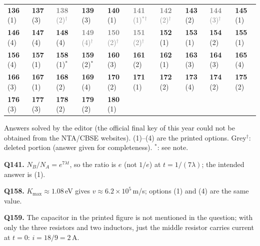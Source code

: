 {\small\setlength{\tabcolsep}{1pt}\renewcommand{\arraystretch}{1.5}
\begin{tabularx}{\linewidth}{@{}*{10}{>{\centering\arraybackslash}X}@{}}\toprule
\textbf{136}\,(1) & \textbf{137}\,(3) & \textcolor{gray}{\textbf{138}\,(2)$^{\dagger}$} & \textbf{139}\,(3) & \textbf{140}\,(1) & \textcolor{gray}{\textbf{141}\,(1)$^{*}$$^{\dagger}$} & \textcolor{gray}{\textbf{142}\,(2)$^{\dagger}$} & \textbf{143}\,(2) & \textcolor{gray}{\textbf{144}\,(3)$^{\dagger}$} & \textbf{145}\,(1)\\
\textbf{146}\,(4) & \textbf{147}\,(4) & \textbf{148}\,(4) & \textcolor{gray}{\textbf{149}\,(4)$^{\dagger}$} & \textcolor{gray}{\textbf{150}\,(2)$^{\dagger}$} & \textcolor{gray}{\textbf{151}\,(2)$^{\dagger}$} & \textbf{152}\,(1) & \textbf{153}\,(1) & \textbf{154}\,(2) & \textbf{155}\,(1)\\
\textbf{156}\,(4) & \textbf{157}\,(1) & \textbf{158}\,(1)$^{*}$ & \textbf{159}\,(2)$^{*}$ & \textbf{160}\,(3) & \textbf{161}\,(2) & \textbf{162}\,(1) & \textbf{163}\,(3) & \textbf{164}\,(3) & \textbf{165}\,(4)\\
\textbf{166}\,(3) & \textbf{167}\,(1) & \textbf{168}\,(2) & \textbf{169}\,(4) & \textbf{170}\,(2) & \textbf{171}\,(1) & \textbf{172}\,(2) & \textbf{173}\,(4) & \textbf{174}\,(2) & \textbf{175}\,(2)\\
\textbf{176}\,(3) & \textbf{177}\,(3) & \textbf{178}\,(2) & \textbf{179}\,(2) & \textbf{180}\,(1) &  &  &  &  & \\\bottomrule\end{tabularx}}\par\smallskip
{\footnotesize Answers solved by the editor (the official final key of this year could not be obtained from the NTA/CBSE websites). (1)--(4) are the printed options. {\color{gray}Grey$^{\dagger}$}: deleted portion (answer given for completeness). $^{*}$: see note.\par
\par\smallskip\textbf{Q141.} $N_B/N_A=e^{7\lambda t}$, so the ratio is $e$ (not $1/e$) at $t=1/(7\lambda)$; the intended answer is (1).
\par\smallskip\textbf{Q158.} $K_{\max}\approx1.08$\,eV gives $v\approx6.2\times10^5$\,m/s; options (1) and (4) are the same value.
\par\smallskip\textbf{Q159.} The capacitor in the printed figure is not mentioned in the question; with only the three resistors and two inductors, just the middle resistor carries current at $t=0$: $i=18/9=2$\,A.
}\par
